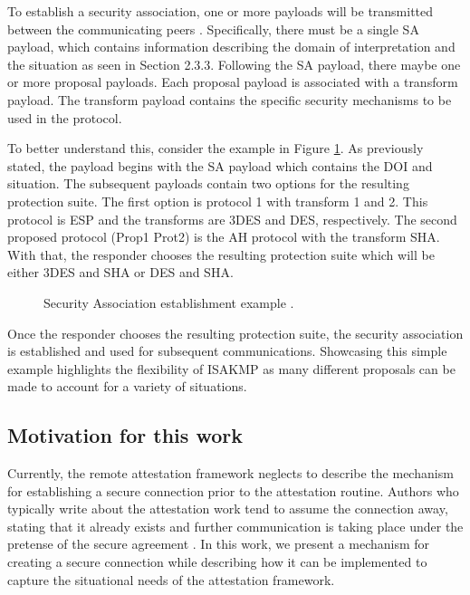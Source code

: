 \documentclass[12pt, letterpaper, twoside]{article}
\begin{document}
To establish a security association, one or more payloads will be transmitted between the communicating peers \cite{ISAKMP}. Specifically, there must be a single SA payload, which contains information describing the domain of interpretation and the situation as seen in Section 2.3.3. Following the SA payload, there maybe one or more proposal payloads. Each proposal payload is associated with a transform payload. The transform payload contains the specific security mechanisms to be used in the protocol. 

To better understand this, consider the example in Figure \ref{fig:pay_ex}. As previously stated, the payload begins with the SA payload which contains the DOI and situation. The subsequent payloads contain two options for the resulting protection suite. The first option is protocol 1 with transform 1 and 2. This protocol is ESP and the transforms are 3DES and DES, respectively. The second proposed protocol (Prop1 Prot2) is the AH protocol with the transform SHA. With that, the responder chooses the resulting protection suite which will be either 3DES and SHA or DES and SHA. 

\begin{figure}[hbtp]
\centering
  
  \caption{Security Association establishment example \cite{ISAKMP}.}
  \label{fig:pay_ex}
\end{figure}

Once the responder chooses the resulting protection suite, the security association is established and used for subsequent communications. Showcasing this simple example highlights the flexibility of ISAKMP as many different proposals can be made to account for a variety of situations. 

\subsection{Motivation for this work}
Currently, the remote attestation framework neglects to describe the mechanism for establishing a secure connection prior to the attestation routine. Authors who typically write about the attestation work tend to assume the connection away, stating that it already exists and further communication is taking place under the pretense of the secure agreement \cite{ietf-reference-interaction-models-04}. In this work, we present a mechanism for creating a secure connection while describing how it can be implemented to capture the situational needs of the attestation framework.    
\end{document}
